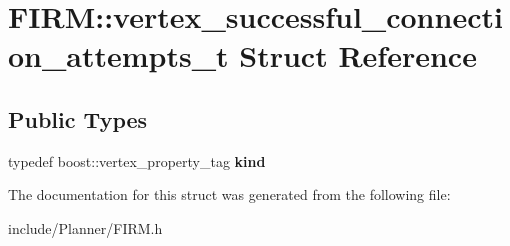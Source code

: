 \hypertarget{struct_f_i_r_m_1_1vertex__successful__connection__attempts__t}{\section{\-F\-I\-R\-M\-:\-:vertex\-\_\-successful\-\_\-connection\-\_\-attempts\-\_\-t \-Struct \-Reference}
\label{struct_f_i_r_m_1_1vertex__successful__connection__attempts__t}
}
\subsection*{\-Public \-Types}
\begin{DoxyCompactItemize}
\item 
\hypertarget{struct_f_i_r_m_1_1vertex__successful__connection__attempts__t_a733ba6f888f1adc641d746377eb13eec}{typedef boost\-::vertex\-\_\-property\-\_\-tag {\bfseries kind}}\label{struct_f_i_r_m_1_1vertex__successful__connection__attempts__t_a733ba6f888f1adc641d746377eb13eec}

\end{DoxyCompactItemize}


\-The documentation for this struct was generated from the following file\-:\begin{DoxyCompactItemize}
\item 
include/\-Planner/\-F\-I\-R\-M.\-h\end{DoxyCompactItemize}
